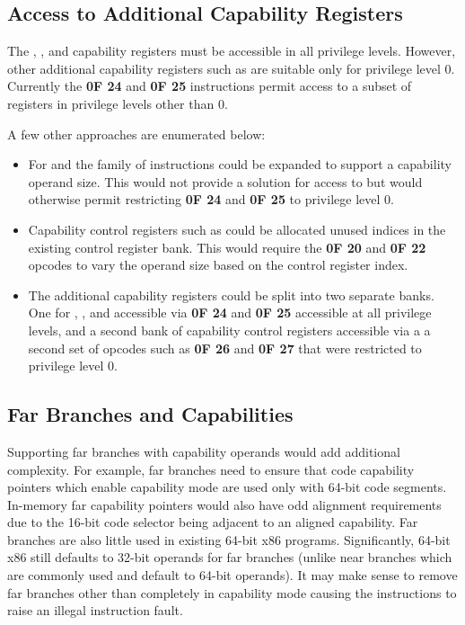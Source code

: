 \subsection{Access to Additional Capability Registers}

The \CFS{}, \CGS{}, and \DDC{} capability registers must be accessible
in all privilege levels.  However, other additional capability
registers such as \KGS{} are suitable only for privilege level 0.
Currently the \textbf{0F 24} and \textbf{0F 25} instructions permit
access to a subset of registers in privilege levels other than 0.

A few other approaches are enumerated below:

\begin{itemize}
  \item For \CFS{} and \CGS{} the  family of
    instructions could be expanded to support a capability operand
    size.  This would not provide a solution for access to \DDC{} but
    would otherwise permit restricting \textbf{0F 24} and \textbf{0F
      25} to privilege level 0.

  \item Capability control registers such as \KGS{} could be allocated
    unused indices in the existing control register bank.  This would
    require the \textbf{0F 20} and \textbf{0F 22} opcodes to vary the
    operand size based on the control register index.

  \item The additional capability registers could be split into two
    separate banks.  One for \CFS{}, \CGS{}, and \DDC{} accessible via
    \textbf{0F 24} and \textbf{0F 25} accessible at all privilege
    levels, and a second bank of capability control registers
    accessible via a a second set of opcodes such as \textbf{0F 26}
    and \textbf{0F 27} that were restricted to privilege level 0.
\end{itemize}

\subsection{Far Branches and Capabilities}

Supporting far branches with capability operands would add additional
complexity.  For example, far branches need to ensure that code
capability pointers which enable capability mode are used only with
64-bit code segments.  In-memory far capability pointers would also
have odd alignment requirements due to the 16-bit code selector being
adjacent to an aligned capability.  Far branches are also little used
in existing 64-bit x86 programs.  Significantly, 64-bit x86 still
defaults to 32-bit operands for far branches (unlike near branches
which are commonly used and default to 64-bit operands).  It may make
sense to remove far branches other than  completely
in capability mode causing the instructions to raise an illegal
instruction fault.

